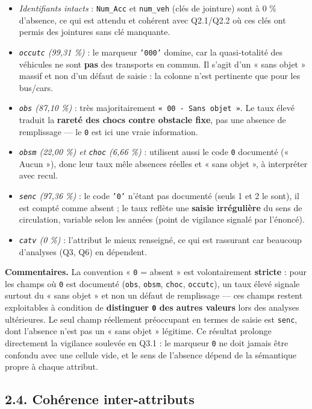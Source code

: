 \documentclass[11pt,a4paper]{article}
\newcommand{\rub}[2]{\textbf{\textcolor{#1}{#2}}}
\begin{document}
\begin{itemize}
\item \emph{Identifiants intacts} : \texttt{Num\_Acc} et \texttt{num\_veh} (clés de jointure) sont à 0 \% d'absence, ce qui est attendu et cohérent avec Q2.1/Q2.2 où ces clés ont permis des jointures sans clé manquante.
\item \emph{\texttt{occutc} (99,31 \%)} : le marqueur \texttt{'000'} domine, car la quasi-totalité des véhicules ne sont \textbf{pas} des transports en commun. Il s'agit d'un « sans objet » massif et non d'un défaut de saisie : la colonne n'est pertinente que pour les bus/cars.
\item \emph{\texttt{obs} (87,10 \%)} : très majoritairement \texttt{« 00 - Sans objet »}. Le taux élevé traduit la \textbf{rareté des chocs contre obstacle fixe}, pas une absence de remplissage — le \texttt{0} est ici une vraie information.
\item \emph{\texttt{obsm} (22,00 \%) et \texttt{choc} (6,66 \%)} : utilisent aussi le code \texttt{0} documenté (« Aucun »), donc leur taux mêle absences réelles et « sans objet », à interpréter avec recul.
\item \emph{\texttt{senc} (97,36 \%)} : le code \texttt{'0'} n'étant pas documenté (seuls 1 et 2 le sont), il est compté comme absent ; le taux reflète une \textbf{saisie irrégulière} du sens de circulation, variable selon les années (point de vigilance signalé par l'énoncé).
\item \emph{\texttt{catv} (0 \%)} : l'attribut le mieux renseigné, ce qui est rassurant car beaucoup d'analyses (Q3, Q6) en dépendent.
\end{itemize}

\rub{labcomment}{Commentaires.} La convention « \texttt{0} = absent » est volontairement \textbf{stricte} : pour les champs où \texttt{0} est documenté (\texttt{obs}, \texttt{obsm}, \texttt{choc}, \texttt{occutc}), un taux élevé signale surtout du « sans objet » et non un défaut de remplissage — ces champs restent exploitables à condition de \textbf{distinguer \texttt{0} des autres valeurs} lors des analyses ultérieures. Le seul champ réellement préoccupant en termes de saisie est \texttt{senc}, dont l'absence n'est pas un « sans objet » légitime. Ce résultat prolonge directement la vigilance soulevée en Q3.1 : le marqueur \texttt{0} ne doit jamais être confondu avec une cellule vide, et le sens de l'absence dépend de la sémantique propre à chaque attribut.

\subsection*{2.4. Cohérence inter-attributs}
\end{document}
